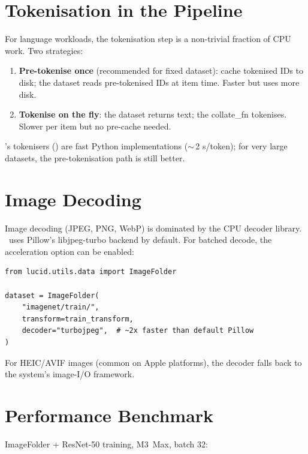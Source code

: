 \section{Tokenisation in the Pipeline}
\label{sec:data_pipeline:tokenisation_pipeline}

For language workloads, the tokenisation step is a non-trivial
fraction of CPU work. Two strategies:

\begin{enumerate}
  \item \textbf{Pre-tokenise once} (recommended for fixed
    dataset): cache tokenised IDs to disk; the dataset reads
    pre-tokenised IDs at item time. Faster but uses more disk.
  \item \textbf{Tokenise on the fly}: the dataset returns text;
    the collate\_fn tokenises. Slower per item but no pre-cache
    needed.
\end{enumerate}

\Lucid's tokenisers () are
fast Python implementations (\(\sim\)\,2 \textmu s/token);
for very large datasets, the pre-tokenisation path is still
better.

\section{Image Decoding}
\label{sec:data_pipeline:image_decoding}

Image decoding (JPEG, PNG, WebP) is dominated by the CPU
decoder library. \Lucid\ uses Pillow's libjpeg-turbo backend
by default. For batched decode, the
 acceleration option can be enabled:

\begin{lstlisting}[style=lucid,language=LucidPython]
from lucid.utils.data import ImageFolder

dataset = ImageFolder(
    "imagenet/train/",
    transform=train_transform,
    decoder="turbojpeg",  # ~2x faster than default Pillow
)
\end{lstlisting}

For HEIC/AVIF images (common on Apple platforms), the decoder
falls back to the system's image-I/O framework.

\section{Performance Benchmark}
\label{sec:data_pipeline:perf_bench}

ImageFolder + ResNet-50 training, M3~Max, batch 32:

